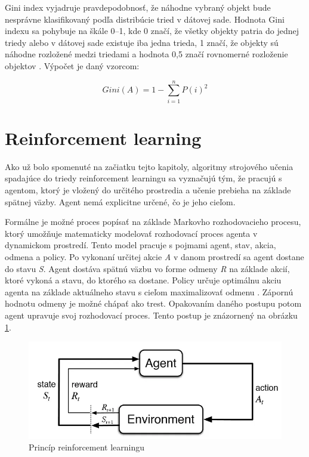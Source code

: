 \documentclass[slovak, master]{diploma}
\begin{document}
Gini index vyjadruje pravdepodobnosť, že náhodne vybraný objekt bude nesprávne klasifikovaný podľa distribúcie tried v dátovej sade. Hodnota Gini indexu sa pohybuje na škále 0--1, kde 0 značí, že všetky objekty patria do jednej triedy alebo v dátovej sade existuje iba jedna trieda, 1 značí, že objekty sú náhodne rozložené medzi triedami a hodnota 0,5 značí rovnomerné rozloženie objektov \cite{Gini}. Výpočet je daný vzorcom:

\[Gini(A) = 1 - \displaystyle\sum\limits_{i=1}^n P(i)^2\]

\section{Reinforcement learning}
\label{sec:ReinfoOverview}
Ako už bolo spomenuté na začiatku tejto kapitoly, algoritmy strojového učenia spadajúce do triedy reinforcement learningu sa vyznačujú tým, že pracujú s agentom, ktorý je vložený do určitého prostredia a učenie prebieha na základe spätnej väzby. Agent nemá explicitne určené, čo je jeho cieľom. 

Formálne je možné proces popísať na základe Markovho rozhodovacieho procesu, ktorý umožňuje matematicky modelovať rozhodovací proces agenta v dynamickom prostredí. Tento model pracuje s pojmami agent, stav, akcia, odmena a policy. Po vykonaní určitej akcie \textit{A} v danom prostredí sa agent dostane do stavu \textit{S}. Agent dostáva spätnú väzbu vo forme odmeny \textit{R} na základe akcií, ktoré vykoná a stavu, do ktorého sa dostane. Policy určuje optimálnu akciu agenta na základe aktuálneho stavu s cieľom maximalizovať odmenu \cite{Markov}. Zápornú hodnotu odmeny je možné chápať ako trest. Opakovaním daného postupu potom agent upravuje svoj rozhodovací proces. Tento postup je znázornený na obrázku \ref{pic:reinfoPic}.
  
\begin{figure}[!htbp]
    \centering
    \includegraphics[width=.9\textwidth]{Figures/reinfoGraph.png}
    \caption{Princíp reinforcement learningu \cite{reinfoGraph}}
    \label{pic:reinfoPic}
\end{figure}
\end{document}
